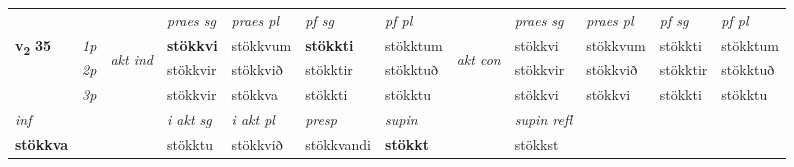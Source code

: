 \begin{longtable}[l]{X>{\footnotesize\itshape}llXXXXlXXXX}
\midrule

 & &   & \textit{praes sg}  & \textit{praes pl}    & \textit{ pf sg} & \textit{pf pl} & & \textit{praes sg}  & \textit{praes pl}    & \textit{pf sg} & \textit{pf pl }  \\ \cmidrule{4-7} \cmidrule{9-12}
 \multirow{2}{*}{{{\textbf{v{\textsubscript{2}}} \Large{\textbf{35}}}}}  & 1p & \multirow{3}{*}{\begin{turn}{90}\textit{akt ind}\end{turn}} & \textbf{stökkvi} & stökkvum & \textbf{stökkti} & stökktum & \multirow{3}{*}{\begin{turn}{90}\textit{akt con}\end{turn}} &stökkvi & stökkvum & stökkti & stökktum\\*
 & 2p &  &  stökkvir  & stökkvið & stökktir & stökktuð & & stökkvir & stökkvið & stökktir & stökktuð \\*
 & 3p &  & stökkvir & stökkva & stökkti & stökktu & & stökkvi & stökkvi& stökkti & stökktu \\*
\cmidrule{4-7} \cmidrule{9-12}

   {\textit{inf}} & &  & \textit{i akt sg} & \textit{i akt pl}   & \textit{presp} & \textit{supin} && \textit{supin refl}  \\*
  {\textbf{stökkva}} & && stökktu  & stökkvið   & stökkvandi &  \textbf{stökkt} && stökkst  \\*

\midrule


\end{longtable}

